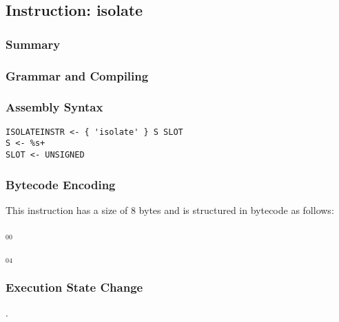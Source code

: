 \subsection{Instruction: isolate}

\subsubsection{Summary}


\subsubsection{Grammar and Compiling}


\subsubsection{Assembly Syntax}

\begin{myquote}
\begin{verbatim}
ISOLATEINSTR <- { 'isolate' } S SLOT
S <- %s+
SLOT <- UNSIGNED
\end{verbatim}
\end{myquote}


\subsubsection{Bytecode Encoding}

This instruction has a size of 8 bytes and is structured in bytecode as follows:

$_{00}$\ 



$_{04}$\ 


\subsubsection{Execution State Change}

.


